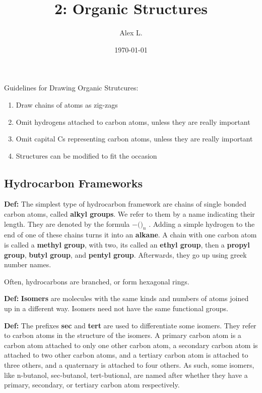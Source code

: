 \documentclass{article}
\title{2: Organic Structures}
\author{Alex L.}
\date{\today}
\begin{document}
\maketitle

Guidelines for Drawing Organic Strutcures:

\begin{enumerate}
    \item Draw chains of atoms as zig-zags
    \item Omit hydrogens attached to carbon atoms, unless they are really important
    \item Omit capital Cs representing carbon atoms, unless they are really important
    \item Structures can be modified to fit the occasion
\end{enumerate}

\subsection{Hydrocarbon Frameworks}

\textbf{Def:} The simplest type of hydrocarbon framework are chains of single bonded carbon atoms, called \textbf{alkyl groups}. We refer to them by a name indicating their length. They are denoted by the formula $-($$)_n$ . Adding a simple hydrogen to the end of one of these chains turns it into an \textbf{alkane}. A chain with one carbon atom is called a \textbf{methyl group}, with two, its called an \textbf{ethyl group}, then a \textbf{propyl group}, \textbf{butyl group}, and \textbf{pentyl group}. Afterwards, they go up using greek number names. 

Often, hydrocarbons are branched, or form hexagonal rings.

\textbf{Def:} \textbf{Isomers} are molecules with the same kinds and numbers of atoms joined up in a different way. Isomers need not have the same functional groups. 

\textbf{Def:} The prefixes \textbf{sec} and \textbf{tert} are used to differentiate some isomers. They refer to carbon atoms in the structure of the isomers. A primary carbon atom is a carbon atom attached to only one other carbon atom, a secondary carbon atom is attached to two other carbon atoms, and a tertiary carbon atom is attached to three others, and a quaternary is attached to four others. As such, some isomers, like n-butanol, sec-butanol, tert-butional, are named after whether they have a primary, secondary, or tertiary carbon atom respectively.
\end{document}
